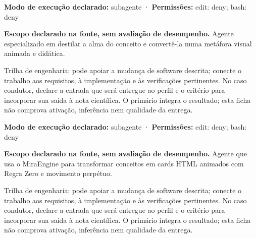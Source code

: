 \begin{arquitetura}
\textbf{Modo de execução declarado:} subagente · \textbf{Permissões:} edit: deny; bash: deny
\end{arquitetura}


\begin{descricao}
\textbf{Escopo declarado na fonte, sem avaliação de desempenho.}
Agente especializado em destilar a alma do conceito e convertê-la numa metáfora visual animada e didática.
\end{descricao}

\begin{funcao}
Trilha de engenharia: pode apoiar a mudança de software descrita; conecte o trabalho aos requisitos, à implementação e às verificações pertinentes. No caso condutor, declare a entrada que será entregue ao perfil e o critério para incorporar sua saída à nota científica. O primário integra o resultado; esta ficha não comprova ativação, inferência nem qualidade da entrega.
\end{funcao}

\begin{arquitetura}
\textbf{Modo de execução declarado:} subagente · \textbf{Permissões:} edit: deny; bash: deny
\end{arquitetura}


\begin{descricao}
\textbf{Escopo declarado na fonte, sem avaliação de desempenho.}
Agente que usa o MiraEngine para transformar conceitos em cards HTML animados com Regra Zero e movimento perpétuo.
\end{descricao}

\begin{funcao}
Trilha de engenharia: pode apoiar a mudança de software descrita; conecte o trabalho aos requisitos, à implementação e às verificações pertinentes. No caso condutor, declare a entrada que será entregue ao perfil e o critério para incorporar sua saída à nota científica. O primário integra o resultado; esta ficha não comprova ativação, inferência nem qualidade da entrega.
\end{funcao}

